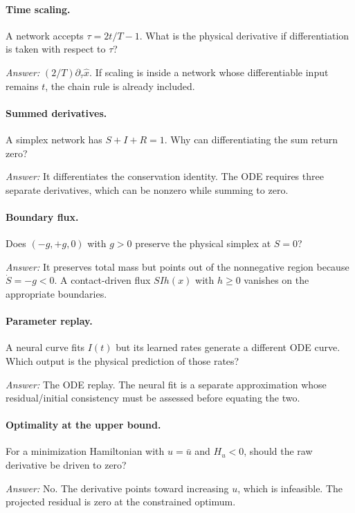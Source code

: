 \documentclass[11pt,a4paper]{article}
\theoremstyle{definition}
\theoremstyle{remark}
\begin{document}
\paragraph{Time scaling.} A network accepts $\tau=2t/T-1$. What is the physical derivative if differentiation is taken with respect to $\tau$?\par
\emph{Answer:} $(2/T)\partial_\tau\hat x$. If scaling is inside a network whose differentiable input remains $t$, the chain rule is already included.

\paragraph{Summed derivatives.} A simplex network has $S+I+R=1$. Why can differentiating the sum return zero?\par
\emph{Answer:} It differentiates the conservation identity. The ODE requires three separate derivatives, which can be nonzero while summing to zero.

\paragraph{Boundary flux.} Does $(-g,+g,0)$ with $g>0$ preserve the physical simplex at $S=0$?\par
\emph{Answer:} It preserves total mass but points out of the nonnegative region because $\dot S=-g<0$. A contact-driven flux $SIh(x)$ with $h\ge0$ vanishes on the appropriate boundaries.

\paragraph{Parameter replay.} A neural curve fits $I(t)$ but its learned rates generate a different ODE curve. Which output is the physical prediction of those rates?\par
\emph{Answer:} The ODE replay. The neural fit is a separate approximation whose residual/initial consistency must be assessed before equating the two.

\paragraph{Optimality at the upper bound.} For a minimization Hamiltonian with $u=\bar u$ and $H_u<0$, should the raw derivative be driven to zero?\par
\emph{Answer:} No. The derivative points toward increasing $u$, which is infeasible. The projected residual is zero at the constrained optimum.
\end{document}
